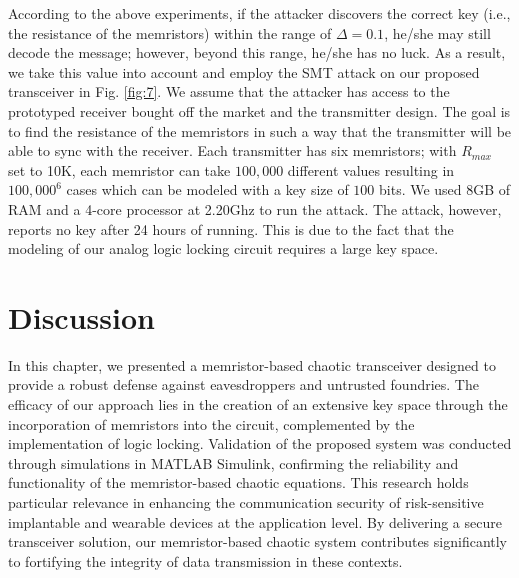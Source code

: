 According to the above experiments, if the attacker discovers the correct key (i.e., the resistance of the memristors) within the range of $\Delta=0.1$, he/she may still decode the message; however, beyond this range, he/she has no luck. As a result, we take this value into account and employ the SMT attack \cite{9000113} on our proposed transceiver in Fig. \ref{fig:7}. We assume that the attacker has access to the prototyped receiver bought off the market and the transmitter design. The goal is to find the resistance of the memristors in such a way that the transmitter will be able to sync with the receiver. Each transmitter has six memristors; with $R_{max}$ set to 10K, each memristor can take $100,000$ different values resulting in $100,000^6$ cases which can be modeled with a key size of $100$ bits. We used 8GB of RAM and a 4-core processor at 2.20Ghz to run the attack. The attack, however, reports no key after 24 hours of running. This is due to the fact that the modeling of our analog logic locking circuit requires a large key space.


\section*{Discussion}

In this chapter, we presented a memristor-based chaotic transceiver designed to provide a robust defense against eavesdroppers and untrusted foundries. The efficacy of our approach lies in the creation of an extensive key space through the incorporation of memristors into the circuit, complemented by the implementation of logic locking. Validation of the proposed system was conducted through simulations in MATLAB Simulink, confirming the reliability and functionality of the memristor-based chaotic equations. This research holds particular relevance in enhancing the communication security of risk-sensitive implantable and wearable devices at the application level. By delivering a secure transceiver solution, our memristor-based chaotic system contributes significantly to fortifying the integrity of data transmission in these contexts.



\endgroup